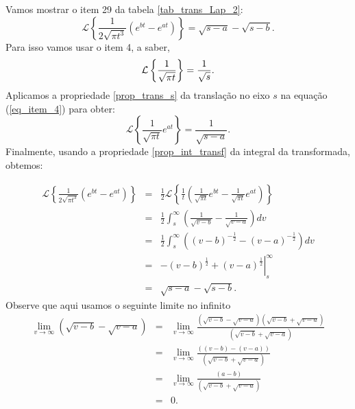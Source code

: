 \documentclass[Main.tex]{subfiles}
\begin{document}
\begin{ex}Vamos mostrar o item 29 da tabela \ref{tab_trans_Lap_2}:
$$
\mathcal{L}\left\{\frac{1}{2\sqrt{\pi t^3}}\left(e^{bt}-e^{at}\right)\right\}=\sqrt{s-a}-\sqrt{s-b}.
$$
Para isso vamos usar o item 4, a saber,
\begin{equation}{\label{eq_item_4}}
\mathcal{L}\left\{\frac{1}{\sqrt{\pi t}}\right\}=\frac{1}{\sqrt{s}}.
\end{equation}
Aplicamos a propriedade \ref{prop_trans_s} da translação no eixo $s$ na equação (\ref{eq_item_4}) para obter:
\begin{equation*}
\mathcal{L}\left\{\frac{1}{\sqrt{\pi t}}e^{at}\right\}=\frac{1}{\sqrt{s-a}}.
\end{equation*}
Finalmente, usando a propriedade \ref{prop_int_transf} da integral da transformada, obtemos:

\begin{eqnarray*}
\mathcal{L}\left\{\frac{1}{2\sqrt{\pi t^3}}\left(e^{bt}-e^{at}\right)\right\}&=&\frac{1}{2}\mathcal{L}\left\{\frac{1}{t}\left(\frac{1}{\sqrt{\pi t}}e^{bt}-\frac{1}{\sqrt{\pi t}}e^{at}\right)\right\}\\
&=&\frac{1}{2}\int_s^\infty\left(   \frac{1}{\sqrt{v-b}}-  \frac{1}{\sqrt{v-a}}\right)dv\\
&=&\frac{1}{2}\int_s^\infty  \left( \left(v-b\right)^{-\frac{1}{2}}-  \left(v-a\right)^{-\frac{1}{2}}\right)dv\\
&=&\left. -\left(v-b\right)^{\frac{1}{2}}+ \left(v-a\right)^{\frac{1}{2}}\right|_s^\infty\\
&=&\sqrt{s-a}-\sqrt{s-b}.
\end{eqnarray*}
Observe que aqui usamos o seguinte limite no infinito
\begin{eqnarray*}
\lim_{v\to\infty}\left( \sqrt{v-b}- \sqrt{v-a}\right)&=&\lim_{v\to\infty}\frac{\left(\sqrt{v-b}- \sqrt{v-a}\right)\left(\sqrt{v-b}+ \sqrt{v-a}\right)}{\left(\sqrt{v-b}+ \sqrt{v-a}\right)}\\
&=&\lim_{v\to\infty}\frac{\left((v-b)- (v-a)\right)}{\left(\sqrt{v-b}+ \sqrt{v-a}\right)}\\
&=&\lim_{v\to\infty}\frac{\left(a-b\right)}{\left(\sqrt{v-b}+ \sqrt{v-a}\right)}\\
&=&0.
\end{eqnarray*}
\end{ex}
\end{document}
